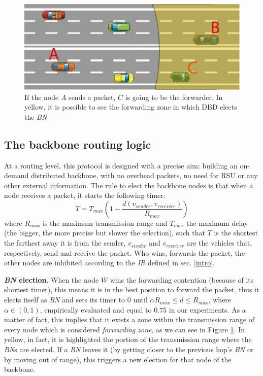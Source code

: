 \documentclass{acm_proc_article-sp}
\begin{document}
\begin{figure}[tb]
\begin{center}
\includegraphics[width=.9\columnwidth]{./fig/CarreggiataNOc.eps}
\caption{If the node $A$ sends a packet, $C$ is going to be the forwarder. In yellow, it is possible to see the forwarding zone in which DBD elects the \textit{BN}}
\label{fig:carreggiata}
\end{center}
\end{figure}



\subsection{The backbone routing logic}
\label{DBD}

At a routing level, this protocol is designed with a precise aim: building an on-demand distributed backbone, with no overhead packets, no need for RSU or any other external information.
The rule to elect the backbone nodes is that when a node receives a packet, it starts the following timer:
\begin{equation}
\label{eq:timer}
T = T_{max} \left(1- \frac{d(v_{sender},v_{receiver})}{R_{max}}\right)
\end{equation}
where $R_{max}$ is the maximum transmission range and $T_{max}$ the maximum delay (the bigger, the more precise but slower the selection), such that $T$ is the shortest the farthest away it is from the sender, $v_{sender}$ and $v_{receiver}$ are the vehicles that, respectively, send and receive the packet. Who wins, forwards the packet, the other nodes are inhibited according to the \textit{IR} defined in sec. \ref{intro}.

\textbf{\textit{BN} election}. When the node $W$ wins the forwarding contention (because of its shortest timer), this means it is in the best position to forward the packet, thus it elects itself as \textit{BN} and sets its timer to 0 until $\alpha R_{max} \le d \le R_{max}$, where $\alpha \in (0,1)$, empirically evaluated and equal to 0.75 in our experiments. As a matter of fact, this implies that it exists a zone within the transmission range of every node which is considered \textit{forwarding zone}, as we can see in Figure \ref{fig:carreggiata}. In yellow, in fact, it is highlighted the portion of the transmission range where the \textit{BN}s are elected. If a \textit{BN} leaves it (by getting closer to the previous hop's \textit{BN} or by moving out of range), this triggers a new election for that node of the backbone.
\end{document}
